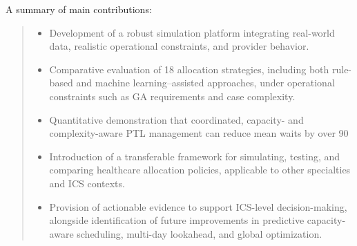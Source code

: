 \documentclass[ %
                    author={Nattanan Nawakitbamrung},
                supervisor={Dr. Sébastien Rochat},
                    degree={MSc},
                     title={Developing and Evaluating the Impact of a Single Patient Treatment List (PTL) for an NHS Integrated Care System},
                  subtitle={},
                      type={},
                      year={2025}]{dissertation}
\begin{document}
\vspace{3cm}
\noindent
A summary of main contributions:
\begin{quote}
    \begin{itemize}
        \item Development of a robust simulation platform integrating real-world data, realistic operational constraints, and provider behavior.
        \item Comparative evaluation of 18 allocation strategies, including both rule-based and machine learning–assisted approaches, under operational constraints such as GA requirements and case complexity.
        \item Quantitative demonstration that coordinated, capacity- and complexity-aware PTL management can reduce mean waits by over 90%
        \item Introduction of a transferable framework for simulating, testing, and comparing healthcare allocation policies, applicable to other specialties and ICS contexts.
        \item Provision of actionable evidence to support ICS-level decision-making, alongside identification of future improvements in predictive capacity-aware scheduling, multi-day lookahead, and global optimization.
    \end{itemize}
\end{quote}





\end{document}
